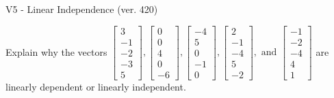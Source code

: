 \begin{exercise}
  \begin{exerciseTitle}V5 - Linear Independence (ver. 420)\end{exerciseTitle}
  \begin{exerciseStatement}
    Explain why the vectors \(\left[\begin{array}{r}
3 \\
-1 \\
-2 \\
-3 \\
5
\end{array}\right] , \left[\begin{array}{r}
0 \\
0 \\
4 \\
0 \\
-6
\end{array}\right] , \left[\begin{array}{r}
-4 \\
5 \\
0 \\
-1 \\
0
\end{array}\right] , \left[\begin{array}{r}
2 \\
-1 \\
-4 \\
5 \\
-2
\end{array}\right] , \text{ and } \left[\begin{array}{r}
-1 \\
-2 \\
-4 \\
4 \\
1
\end{array}\right]\) are linearly dependent or linearly independent.	



\end{exerciseStatement}
\end{exercise}
